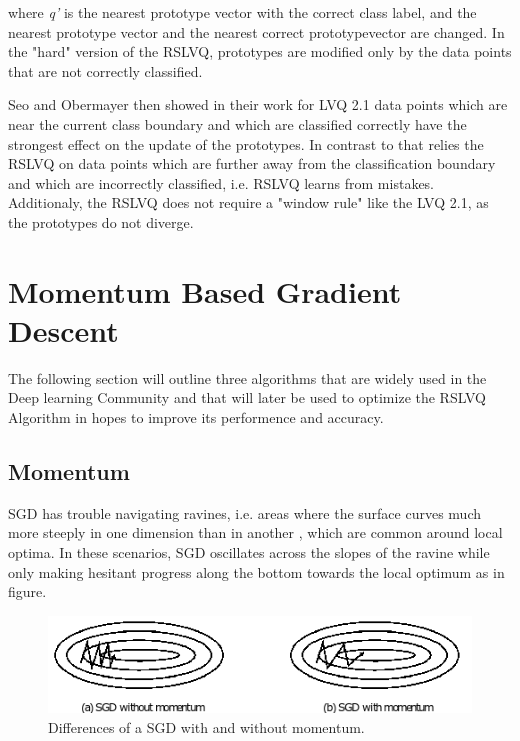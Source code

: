 \documentclass[12pt,oneside,a4paper,parskip]{scrbook}
\begin{document}
where \textit{q'} is the nearest prototype vector with the correct class label, and the nearest prototype vector and the 
nearest correct prototypevector are changed. In the "hard" version of the RSLVQ, prototypes are modified only by the data 
points that are not correctly classified. \cite{RSLVQOrig}

Seo and Obermayer then showed in their work \cite{RSLVQOrig} for LVQ 2.1 data points which are near the current 
class boundary and which are classified correctly have the strongest effect on the update of the prototypes. In contrast to that
relies the RSLVQ on data points which are further away from the classification boundary and which are incorrectly classified,
i.e. RSLVQ learns from mistakes. Additionaly, the RSLVQ does not require a "window rule" like the LVQ 2.1, as the prototypes 
do not diverge. \cite{RSLVQOrig}

\section{Momentum Based Gradient Descent}

The following section will outline three algorithms that are widely used in the Deep learning Community and that will later
be used to optimize the RSLVQ Algorithm in hopes to improve its performence and accuracy.

\subsection{Momentum}

SGD has trouble navigating ravines, i.e. areas where the surface curves much more steeply in one dimension than in another \cite{problemSteepLearn, overvieDiffRSLVQ},
which are common around local optima. In these scenarios, SGD oscillates across the slopes of the ravine while only making 
hesitant progress along the bottom towards the local optimum as in figure.

\begin{figure}[H]
  \centering
  \includegraphics[width=\columnwidth]{SGD_momentum}
  \caption[Diff. SGD moment.]{Differences of a SGD with and without momentum.\footnotemark} 
  \label{fig:SGD_momentum}
\end{figure}
\end{document}
